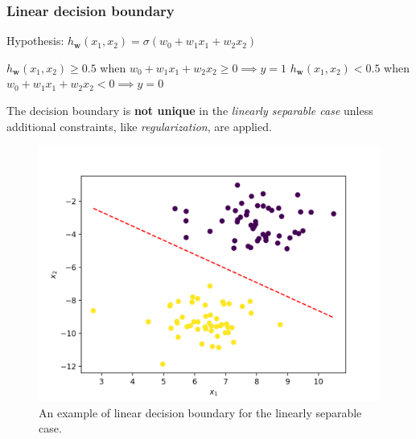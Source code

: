 \documentclass{beamer}
\begin{document}
	\begin{frame}
		\frametitle{Linear decision boundary}
		Hypothesis: $h_{\bm{w}}(x_1, x_2) = \sigma(w_0 + w_1 x_1 + w_2 x_2)$
		
		\vspace{2mm}
		
		$h_{\bm{w}}(x_1, x_2) \geq 0.5$ when $w_0 + w_1 x_1 + w_2 x_2 \geq 0 \implies y = 1$
		$h_{\bm{w}}(x_1, x_2) < 0.5$ when $w_0 + w_1 x_1 + w_2 x_2 < 0 \implies y = 0$
		
		\vspace{1mm}
		
		The decision boundary is \textbf{not unique} in the \textit{linearly separable case} unless additional constraints, like \textit{regularization}, are applied.
		
		\begin{figure}
			\centering
			\includegraphics[scale=0.38]{images/linear_decision_boundary}
			\caption{An example of linear decision boundary for the linearly separable case.}
		\end{figure}
	\end{frame}
\end{document}
